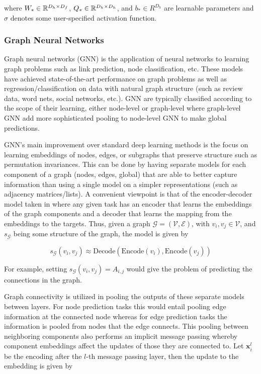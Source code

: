where $W_* \in \mathbb{R}^{D_h \times D_f}$, $Q_* \in \mathbb{R}^{D_h \times D_h}$, and $b_* \in R^{D_h}$ are learnable parameters and $\sigma$ denotes some user-specified activation function.

\subsubsection{Graph Neural Networks}


Graph neural networks (GNN) is the application of neural networks to learning graph problems such as link prediction, node classification, etc. These models have achieved state-of-the-art performance on graph problems as well as regression/classification on data with natural graph structure (such as review data, word nets, social networks, etc.). GNN are typically classified according to the scope of their learning, either node-level or graph-level where graph-level GNN add more sophisticated pooling to node-level GNN to make global predictions. 

GNN's main improvement over standard deep learning methods is the focus on learning embeddings of nodes, edges, or subgraphs that preserve structure such as permutation invariances. This can be done by having separate models for each component of a graph (nodes, edges, global) that are able to better capture information than using a single model on a simpler representations (such as adjacency matrices/lists). A convenient viewpoint is that of the encoder-decoder model taken in \cite{Hamilton2017} where any given task has an encoder that learns the embeddings of the graph components and a decoder that learns the mapping from the embeddings to the targets. Thus, given a graph $\mathcal{G} = (\mathcal{V}, \mathcal{E})$, with $v_i, v_j \in \mathcal{V}$, and $s_{\mathcal{G}}$ being some structure of the graph, the model is given by

\begin{equation}
s_{\mathcal{G}}(v_i, v_j) \approx \text{Decode}(\text{Encode}(v_i), \text{Encode}(v_j))
\end{equation}

For example, setting $s_{\mathcal{G}}(v_i, v_j) = A_{i,j}$ would give the problem of predicting the connections in the graph.

Graph connectivity is utilized in pooling the outputs of these separate models between layers. For node prediction tasks this would entail pooling edge information at the connected node whereas for edge prediction tasks the information is pooled from nodes that the edge connects. This pooling between neighboring components also performs an implicit message passing whereby component embeddings affect the updates of those they are connected to. Let $\pmb{x}_i^{l}$ be the encoding after the $l$-th message passing layer, then the update to the embedding is given by

